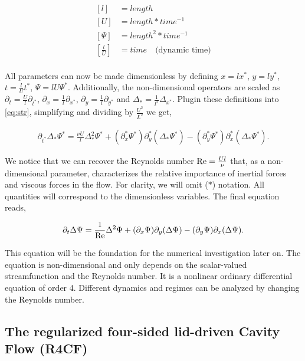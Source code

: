 \begin{equation}
\begin{split}
\left[ l \right] &= length  \\
\left[ U \right] &= length*time^{-1} \\
\left[ \Psi \right] &= length^2*time^{-1} \\
\left[ \frac{l}{U} \right] &= time \quad \text{(dynamic time)} \\
\end{split}
\label{eq:scl}
\end{equation}

All parameters can now be made dimensionless by defining $x = l x^*$, $y = l
y^*$, $t = \frac{l}{U} t^*$, $\Psi = lU \Psi^*$. Additionally, the
non-dimensional operators are scaled as $\partial_t = \frac{U}{l}
\partial_{t^*}$, $\partial_x = \frac{1}{l} \partial_{x^*}$, $\partial_y =
\frac{1}{l} \partial_{y^*}$ and $\Delta_* = \frac{1}{l^2} \Delta_{x^*}$. Plugin
these definitions into \eqref{eq:str}, simplifying and dividing by
$\frac{U^2}{L^2}$ we get,

\begin{align*}
\partial_{t^*} \Delta_* \Psi^* = \frac{\nu U}{l} \Delta^2_* \Psi^*
  + (\partial_x^* \Psi^*) \partial_y^*(\Delta_* \Psi^*)
  - (\partial_y^* \Psi^*) \partial_x^*(\Delta_* \Psi^*). 
\end{align*}

We notice that we can recover the Reynolds number $\mathrm{Re} = \frac{Ul}{\nu}$ that,
as a non-dimensional parameter, characterizes the relative importance of
inertial forces and viscous forces in the flow. For clarity, we will omit ($*$)
notation. All quantities will correspond to the dimensionless variables. The
final equation reads,

\begin{align}
\partial_t \Delta \Psi = \frac{1}{\mathrm{Re}} \Delta^2 \Psi
  + (\partial_x \Psi) \partial_y(\Delta \Psi)
  - (\partial_y \Psi) \partial_x(\Delta \Psi). \label{eq:str}
\end{align}

This equation will be the foundation for the numerical investigation later on.
The equation is non-dimensional and only depends on the scalar-valued
streamfunction and the Reynolds number. It is a nonlinear ordinary differential
equation of order 4. Different dynamics and regimes can be analyzed by changing
the Reynolds number.

\subsection{The regularized four-sided lid-driven Cavity Flow (R4CF)} \label{sec:r4sc}

